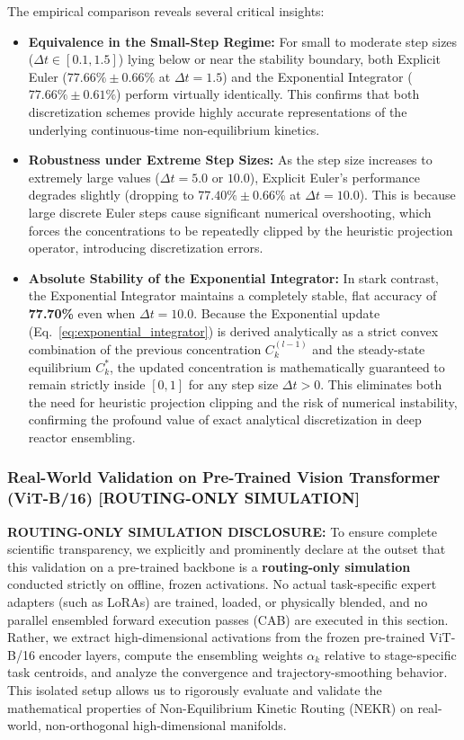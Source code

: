 The empirical comparison reveals several critical insights:
\begin{itemize}
    \item \textbf{Equivalence in the Small-Step Regime:} For small to moderate step sizes ($\Delta t \in [0.1, 1.5]$) lying below or near the stability boundary, both Explicit Euler ($77.66\% \pm 0.66\%$ at $\Delta t = 1.5$) and the Exponential Integrator ($77.66\% \pm 0.61\%$) perform virtually identically. This confirms that both discretization schemes provide highly accurate representations of the underlying continuous-time non-equilibrium kinetics.
    \item \textbf{Robustness under Extreme Step Sizes:} As the step size increases to extremely large values ($\Delta t = 5.0$ or $10.0$), Explicit Euler's performance degrades slightly (dropping to $77.40\% \pm 0.66\%$ at $\Delta t = 10.0$). This is because large discrete Euler steps cause significant numerical overshooting, which forces the concentrations to be repeatedly clipped by the heuristic projection operator, introducing discretization errors.
    \item \textbf{Absolute Stability of the Exponential Integrator:} In stark contrast, the Exponential Integrator maintains a completely stable, flat accuracy of \textbf{77.70\%} even when $\Delta t = 10.0$. Because the Exponential update (Eq.~\ref{eq:exponential_integrator}) is derived analytically as a strict convex combination of the previous concentration $C_k^{(l-1)}$ and the steady-state equilibrium $C_k^*$, the updated concentration is mathematically guaranteed to remain strictly inside $[0, 1]$ for any step size $\Delta t > 0$. This eliminates both the need for heuristic projection clipping and the risk of numerical instability, confirming the profound value of exact analytical discretization in deep reactor ensembling.
\end{itemize}

\subsubsection{Real-World Validation on Pre-Trained Vision Transformer (ViT-B/16) [ROUTING-ONLY SIMULATION]}
\label{sec:real_world_vit}
\textbf{ROUTING-ONLY SIMULATION DISCLOSURE:} To ensure complete scientific transparency, we explicitly and prominently declare at the outset that this validation on a pre-trained backbone is a \textbf{routing-only simulation} conducted strictly on offline, frozen activations. No actual task-specific expert adapters (such as LoRAs) are trained, loaded, or physically blended, and no parallel ensembled forward execution passes (CAB) are executed in this section. Rather, we extract high-dimensional activations from the frozen pre-trained ViT-B/16 encoder layers, compute the ensembling weights $\alpha_k$ relative to stage-specific task centroids, and analyze the convergence and trajectory-smoothing behavior. This isolated setup allows us to rigorously evaluate and validate the mathematical properties of Non-Equilibrium Kinetic Routing (NEKR) on real-world, non-orthogonal high-dimensional manifolds.

